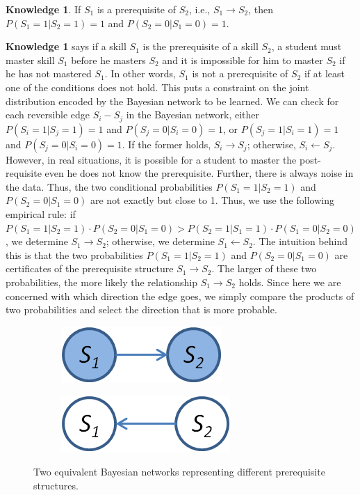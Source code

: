 \documentclass{edm_template}
\begin{document}
\textbf{Knowledge 1}. If $S_1$ is a prerequisite of $S_2$, i.e., $S_1\rightarrow S_2$, then $P(S_1=1|S_2=1)= 1$ and $P(S_2=0|S_1=0)= 1$.

\textbf{Knowledge 1} says if a skill $S_1$ is the prerequisite of a skill $S_2$,
a student must master skill $S_1$ before he masters $S_2$ and it is impossible for him to master $S_2$ if he has not mastered $S_1$.
In other words, $S_1$ is not a prerequisite of $S_2$ if at least one of the conditions does not hold.
This puts a constraint on the joint distribution encoded by the Bayesian network to be learned.
We can check for each reversible edge $S_i-S_j$ in the Bayesian network, either $P(S_i=1|S_j=1)= 1$ and $P(S_j=0|S_i=0)= 1$, or $P(S_j=1|S_i=1)= 1$ and $P(S_j=0|S_i=0)= 1$. 
If the former holds, $S_i\rightarrow S_j$; otherwise, $S_i\leftarrow S_j$.  
However, in real situations, it is possible for a student to master the post-requisite even he does not know the prerequisite. 
Further, there is always noise in the data. Thus, the two conditional probabilities $P(S_1=1|S_2=1)$ and $P(S_2=0|S_1=0)$ are not exactly but close to 1.
Thus, we use the following empirical rule: if $P(S_1=1|S_2=1)\cdot P(S_2=0|S_1=0)>P(S_2=1|S_1=1)\cdot P(S_1=0|S_2=0)$, we determine $S_1\rightarrow S_2$; 
otherwise, we determine $S_1\leftarrow S_2$. 
The intuition behind this is that the two probabilities $P(S_1=1|S_2=1)$ and $P(S_2=0|S_1=0)$ are certificates of the prerequisite structure $S_1\rightarrow S_2$.
The larger of these two probabilities, the more likely the relationship $S_1\rightarrow S_2$ holds.
Since here we are concerned with which direction the edge goes, we simply compare the products of two probabilities and select the direction that is more probable. 

	\begin{figure}[!ht]\small
		\centering
		\begin{subfigure}[t]{0.45\linewidth}
			\centering
			\includegraphics[width=0.5\linewidth]{figures/s1s2.png}
			\caption{\label{fig:equivnet1}}
		\end{subfigure}
		\begin{subfigure}[t]{0.45\linewidth}
			\centering
			\includegraphics[width=0.5\linewidth]{figures/s2s1.png}
			\caption{\label{fig:equivnet2}}
		\end{subfigure}
		\caption{Two equivalent Bayesian networks representing different prerequisite structures.\label{fig:equivnets} }
	\end{figure}
\end{document}
